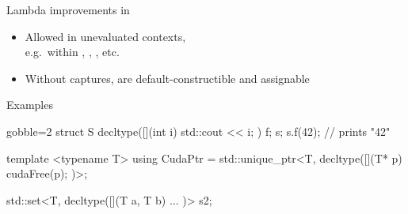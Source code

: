 \begin{advanced}
\begin{frame}[fragile]
  \begin{block}{Lambda improvements in }
    \begin{itemize}
      \item Allowed in unevaluated contexts,\\
            e.g.\ within , , , etc.
      \item Without captures, are default-constructible and assignable
    \end{itemize}
  \end{block}
  \begin{exampleblock}{Examples}
    \small
    \begin{cppcode*}{gobble=2}
      struct S {
        decltype([](int i) { std::cout << i; }) f;
      } s;
      s.f(42); // prints "42"

      template <typename T>
      using CudaPtr = std::unique_ptr<T,
                        decltype([](T* p){ cudaFree(p); })>;

      std::set<T, decltype([](T a, T b) { ... })> s2;
    \end{cppcode*}
  \end{exampleblock}

\end{frame}

\end{advanced}
